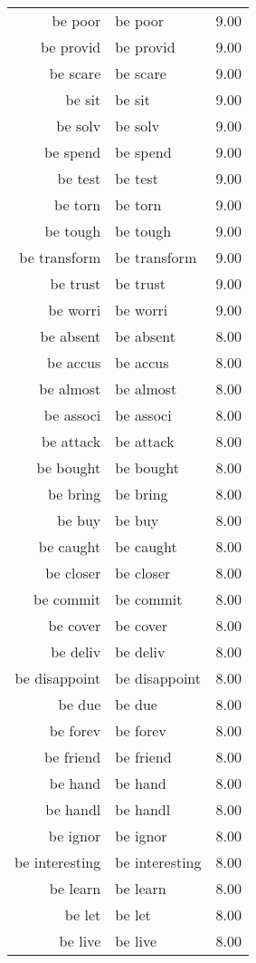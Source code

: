 \begin{table}[ht]
\begin{tabular}{rlr}
  be poor & be poor & 9.00 \\ 
  be provid & be provid & 9.00 \\ 
  be scare & be scare & 9.00 \\ 
  be sit & be sit & 9.00 \\ 
  be solv & be solv & 9.00 \\ 
  be spend & be spend & 9.00 \\ 
  be test & be test & 9.00 \\ 
  be torn & be torn & 9.00 \\ 
  be tough & be tough & 9.00 \\ 
  be transform & be transform & 9.00 \\ 
  be trust & be trust & 9.00 \\ 
  be worri & be worri & 9.00 \\ 
  be absent & be absent & 8.00 \\ 
  be accus & be accus & 8.00 \\ 
  be almost & be almost & 8.00 \\ 
  be associ & be associ & 8.00 \\ 
  be attack & be attack & 8.00 \\ 
  be bought & be bought & 8.00 \\ 
  be bring & be bring & 8.00 \\ 
  be buy & be buy & 8.00 \\ 
  be caught & be caught & 8.00 \\ 
  be closer & be closer & 8.00 \\ 
  be commit & be commit & 8.00 \\ 
  be cover & be cover & 8.00 \\ 
  be deliv & be deliv & 8.00 \\ 
  be disappoint & be disappoint & 8.00 \\ 
  be due & be due & 8.00 \\ 
  be forev & be forev & 8.00 \\ 
  be friend & be friend & 8.00 \\ 
  be hand & be hand & 8.00 \\ 
  be handl & be handl & 8.00 \\ 
  be ignor & be ignor & 8.00 \\ 
  be interesting & be interesting & 8.00 \\ 
  be learn & be learn & 8.00 \\ 
  be let & be let & 8.00 \\ 
  be live & be live & 8.00 \\ 

\end{tabular}
\end{table}

